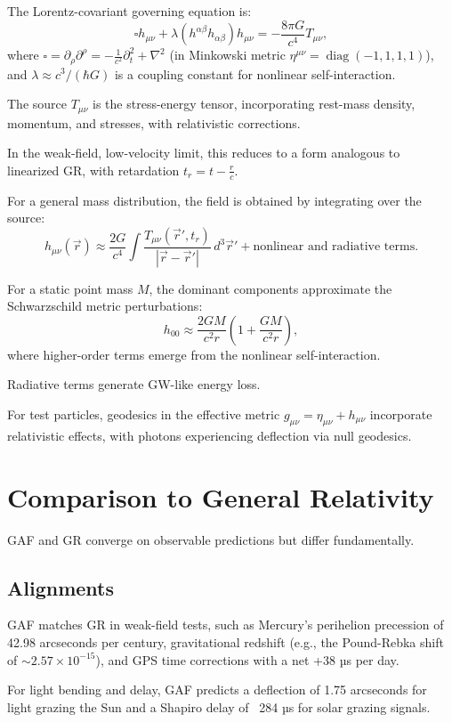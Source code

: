 \documentclass{article}
\begin{document}
The Lorentz-covariant governing equation is:
$$\square h_{\mu\nu} + \lambda (h^{\alpha\beta} h_{\alpha\beta}) h_{\mu\nu} = -\frac{8\pi G}{c^4} T_{\mu\nu},$$
where $ \square = \partial_\rho \partial^\rho = -\frac{1}{c^2} \partial_t^2 + \nabla^2 $ (in Minkowski metric $ \eta^{\mu\nu} = \operatorname{diag}(-1,1,1,1) $), and $\lambda \approx c^3 / (\hbar G)$ is a coupling constant for nonlinear self-interaction.  

The source $ T_{\mu\nu} $ is the stress-energy tensor, incorporating rest-mass density, momentum, and stresses, with relativistic corrections.

In the weak-field, low-velocity limit, this reduces to a form analogous to linearized GR, with retardation $ t_r = t - \frac{r}{c} $.

For a general mass distribution, the field is obtained by integrating over the source:
$$h_{\mu\nu}(\vec{r}) \approx \frac{2G}{c^4} \int \frac{T_{\mu\nu}(\vec{r}', t_r)}{|\vec{r} - \vec{r}'|} \, d^3 \vec{r}' + \text{nonlinear and radiative terms}.$$

For a static point mass $ M $, the dominant components approximate the Schwarzschild metric perturbations:
$$h_{00} \approx \frac{2 G M}{c^2 r} \left( 1 + \frac{G M}{c^2 r} \right),$$
where higher-order terms emerge from the nonlinear self-interaction.

Radiative terms generate GW-like energy loss. 

For test particles, geodesics in the effective metric $ g_{\mu\nu} = \eta_{\mu\nu} + h_{\mu\nu} $ incorporate relativistic effects, with photons experiencing deflection via null geodesics.

\section{Comparison to General Relativity}

GAF and GR converge on observable predictions but differ fundamentally.

\subsection{Alignments}

GAF matches GR in weak-field tests, such as Mercury's perihelion precession of 42.98 arcseconds per century, gravitational redshift (e.g., the Pound-Rebka shift of \( \sim 2.57 \times 10^{-15} \)), and GPS time corrections with a net +38 µs per day.

For light bending and delay, GAF predicts a deflection of 1.75 arcseconds for light grazing the Sun and a Shapiro delay of ~284 µs for solar grazing signals.
\end{document}
